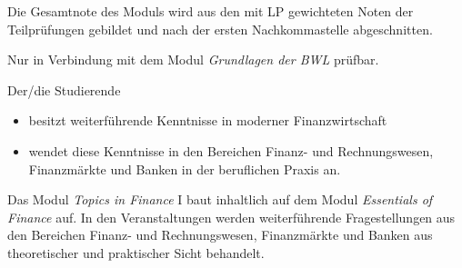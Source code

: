\begin{module}
\begin{styleenv}
\begin{assessment}
 

Die Gesamtnote des Moduls wird aus den mit LP gewichteten Noten der Teilprüfungen gebildet und nach der ersten Nachkommastelle abgeschnitten.


\end{assessment}

\begin{conditions}Nur in Verbindung mit dem Modul \emph{Grundlagen der BWL} prüfbar.

 \end{conditions}


\end{styleenv}

\begin{learningoutcomes}
Der/die Studierende

 \begin{itemize}\item besitzt weiterführende Kenntnisse in moderner Finanzwirtschaft  \item wendet diese Kenntnisse in den Bereichen Finanz- und Rechnungswesen, Finanzmärkte und Banken in der beruflichen Praxis an.  \end{itemize}
\end{learningoutcomes}

\begin{content}
Das Modul \emph{Topics in Finance} I baut inhaltlich auf dem Modul \emph{Essentials of Finance} auf. In den Veranstaltungen werden weiterführende Fragestellungen aus den Bereichen Finanz- und Rechnungswesen, Finanzmärkte und Banken aus theoretischer und praktischer Sicht behandelt.


\end{content}



\end{module}


